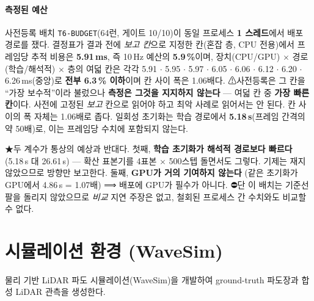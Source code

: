 \documentclass[11pt]{report}
\numberwithin{equation}{chapter}
\numberwithin{figure}{chapter}
\numberwithin{table}{chapter}
\begin{document}
\paragraph{측정된 예산}
사전등록 배치 \texttt{T6-BUDGET}(64런, 게이트 10/10)이 동일 프로세스 \textbf{1 스레드}에서
배포 경로를 쟀다. 결정표가 결과 전에 \emph{보고 칸}으로 지정한 칸(혼잡 층, CPU 전용)에서
프레임당 추적 비용은 \textbf{5.91\,ms}, 즉 10\,Hz 예산의 \textbf{5.9\,\%}이며,
장치(CPU/GPU) $\times$ 경로(학습/해석적) $\times$ 층의 여덟 칸은 각각
5.91 $\cdot$ 5.95 $\cdot$ 5.97 $\cdot$ 6.05 $\cdot$ 6.06 $\cdot$ 6.12 $\cdot$
6.20 $\cdot$ 6.26\,ms(중앙)로 \textbf{전부 6.3\,\% 이하}이며 칸 사이 폭은 1.06배다.
⚠사전등록은 그 칸을 ``가장 보수적''이라 불렀으나 \textbf{측정은 그것을 지지하지 않는다}
--- 여덟 칸 중 \textbf{가장 빠른 칸}이다. 사전에 고정된 \emph{보고} 칸으로 읽어야 하고
최악 사례로 읽어서는 안 된다. 칸 사이의 폭 자체는 1.06배로 좁다.
일회성 초기화는 학습 경로에서 \textbf{5.18\,s}(프레임 간격의 약 50배)로, 이는 프레임당
수치에 포함되지 않는다.

★두 계수가 통상의 예상과 반대다. 첫째, \textbf{학습 초기화가 해석적 경로보다 빠르다}
(5.18\,s 대 26.61\,s) --- 확산 표본기를 4표본 $\times$ 500스텝 돌면서도 그렇다.
기제는 재지 않았으므로 방향만 보고한다. 둘째, \textbf{GPU가 거의 기여하지 않는다}
(같은 초기화가 GPU에서 4.86\,s = 1.07배) ⟹ 배포에 GPU가 필수가 아니다.
⛔단 이 배치는 기준선 팔을 돌리지 않았으므로 \emph{비교} 지연 주장은 없고,
철회된 프로세스 간 수치와도 비교할 수 없다.

\section{시뮬레이션 환경 (WaveSim)}
\label{sec:wavesim}

물리 기반 LiDAR 파도 시뮬레이션(WaveSim)을 개발하여
ground-truth 파도장과 합성 LiDAR 관측을 생성한다.
\end{document}
